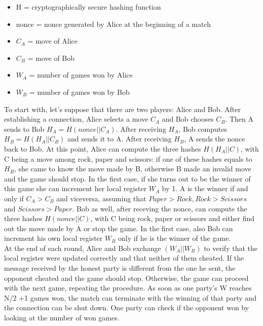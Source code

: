 \documentclass[11 pt]{article}
\begin{document}
\begin{itemize}
	\item H = cryptographically secure hashing function
	\item nonce = nonce generated by Alice at the beginning of a match
	\item $C_A$ = move of Alice
	\item $C_B$ = move of Bob
	\item $W_A$ = number of games won by Alice
	\item $W_B$ = number of games won by Bob
\end{itemize}

To start with, let's suppose that there are two players: Alice and Bob. After establishing a connection, Alice selects a move $C_A$ and Bob chooses $C_B$. Then A sends to Bob $H_A = H(nonce || C_A )$. After receiving $H_A$, Bob computes $H_B = H(H_A || C_B)$ and sends it to A. After receiving $H_B$, A sends the nonce back to Bob. At this point, Alice can compute the three hashes $H(H_A || C)$, with C being a move among rock, paper and scissors: if one of these hashes equals to $H_B$, she came to know the move made by B, otherwise B made an invalid move and the game should stop. In the first case,  if she turns out to be the winner of this game she can increment her local register $W_A$ by 1. A is the winner if and only if $C_A > C_B$ and viceversa, assuming that $Paper > Rock, Rock > Scissors$ and $Scissors > Paper$. Bob as well, after receving the nonce, can compute the three hashes $H(nonce || C)$, with C being rock, paper or scissors and either find out the move made by A or stop the game. In the first case, also Bob can increment his own local register $W_B$ only if he is the winner of the game.\\
At the end of each round, Alice and Bob exchange $(W_A || W_B)$ to verify that the local register were updated correctly and that neither of them cheated. If the message received by the honest party is different from the one he sent, the opponent cheated and the game should stop.
Otherwise, the game can proceed with the next game, repeating the procedure. As soon as one party's W reaches N/2 +1 games won, the match can terminate with the winning of that party and the connection can be shut down. One party can check if the opponent won by looking at the number of won games.
\end{document}
